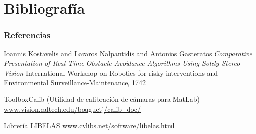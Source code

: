 \documentclass[svgnames]{beamer}
\begin{document}

\section{Bibliograf\'ia}

\begin{frame} 
\frametitle{Referencias} 

\begin{thebibliography}{10} 
\beamertemplatebookbibitems

Ioannis Kostavelis and Lazaros Nalpantidis and Antonios Gasteratos
\newblock \emph{Comparative Presentation of Real-Time Obstacle Avoidance Algorithms Using Solely Stereo Vision}
 International Workshop on Robotics for risky interventions and Environmental Surveillance-Maintenance, 1742 

ToolboxCalib (Utilidad de calibraci\'on de c\'amaras para MatLab)
\url{www.vision.caltech.edu/bouguetj/calib_doc/}


Librería LIBELAS
\url{www.cvlibs.net/software/libelas.html}

\end{thebibliography} 

\end{frame} 
\end{document}
